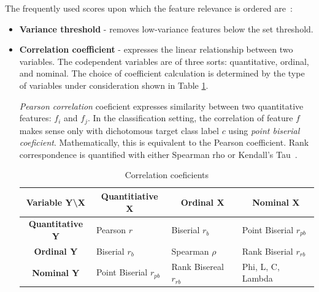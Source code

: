 The frequently used scores upon which the feature relevance is ordered are~\cite{nandi_condition_2019}: 

\begin{itemize}
\item \textbf{Variance threshold} - removes low-variance features below the set threshold.

\item \textbf{Correlation coefficient} - expresses the linear relationship between two variables. The codependent variables are of three sorts: quantitative, ordinal, and nominal. The choice of coefficient calculation is determined by the type of variables under consideration shown in Table \ref{tab:corr-coef}. 


\emph{Pearson correlation} coeficient expresses similarity between two quantitative features: $f_i$ and $f_j$. In the classification setting, the correlation of feature $f$ makes sense only with dichotomous target class label $c$ using \emph{point biserial coeficient}. Mathematically, this is equivalent to the Pearson coefficient. Rank correspondence is quantified with either Spearman rho or Kendall's Tau~\cite{calkins_more_2005}.

\begin{table}[ht]
\renewcommand{\arraystretch}{1.5}
\begin{adjustbox}{width=\columnwidth,center}
\begin{tabular}{|c|l|l|l|}
\hline
\textbf{Variable Y\textbackslash{}X} & \multicolumn{1}{c|}{\textbf{Quantitiative X}} & \multicolumn{1}{c|}{\textbf{Ordinal X}} & \multicolumn{1}{c|}{\textbf{Nominal X}} \\ \hline
\textbf{Quantitative Y}              & Pearson $r$                                   & Biserial $r_b$                          & Point Biserial $r_{pb}$                 \\ \hline
\textbf{Ordinal Y}                   & Biserial $r_b$                                & Spearman $\rho$    & Rank Biserial $r_{rb}$                  \\ \hline
\textbf{Nominal Y}                   & Point Biserial $r_{pb}$                       & Rank Bisereal $r_{rb}$                  & Phi, L, C, Lambda                       \\ \hline
\end{tabular}
\end{adjustbox}
\caption{Correlation coeficients}
\label{tab:corr-coef}
\end{table}


\end{itemize}
